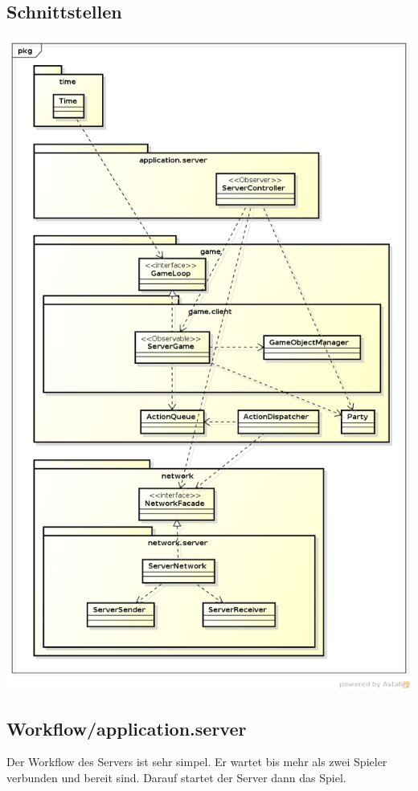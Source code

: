 \documentclass[11pt]{scrartcl}
\begin{document}
\subsection{Schnittstellen}
\includegraphics[scale=0.48]{LogischeSichtServer}


\subsection{Workflow/application.server}

Der Workflow des Servers ist sehr simpel. Er wartet bis mehr als zwei Spieler verbunden und bereit sind. Darauf startet der Server dann das Spiel.
\end{document}
